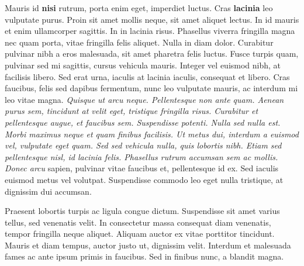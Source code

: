 \documentclass[12pt,a4paper]{report}
\begin{document}
{\color{emph} Mauris id\textbf{ nisi }rutrum, porta enim eget,  {\color{stress} imperdiet luctus. Cras \textbf{lacinia} leo} vulputate purus. Proin sit amet mollis neque, sit} amet aliquet lectus. In id mauris et enim ullamcorper sagittis. In in lacinia risus. Phasellus viverra fringilla magna  nec quam porta, vitae fringilla felis aliquet. Nulla in diam dolor. Curabitur pulvinar nibh a eros malesuada, sit amet pharetra felis luctus. Fusce turpis quam, pulvinar sed mi sagittis, cursus vehicula mauris. Integer vel euismod nibh, at facilisis libero. Sed erat urna, iaculis at lacinia iaculis, consequat et libero. Cras faucibus, felis sed dapibus fermentum, nunc leo vulputate mauris, ac interdum mi leo vitae magna.
\emph{
Quisque ut arcu neque. Pellentesque non ante quam. Aenean purus sem, tincidunt at velit eget, tristique fringilla risus. Curabitur et pellentesque augue, et faucibus sem. Suspendisse potenti. Nulla sed nulla est. Morbi maximus neque et quam finibus facilisis. Ut metus dui, interdum a euismod vel, vulputate eget quam. Sed sed vehicula nulla, quis lobortis nibh. Etiam sed pellentesque nisl, id lacinia felis. Phasellus rutrum accumsan sem ac mollis. Donec arcu }sapien, pulvinar vitae faucibus et, pellentesque id ex. Sed iaculis euismod metus vel volutpat. Suspendisse commodo leo eget nulla tristique, at dignissim dui accumsan.

Praesent lobortis turpis ac ligula congue dictum. Suspendisse sit amet varius tellus, sed venenatis velit. In consectetur massa consequat diam venenatis, tempor fringilla neque aliquet. Aliquam auctor ex vitae porttitor tincidunt. Mauris et diam tempus, auctor justo ut, dignissim velit. Interdum et malesuada fames ac ante ipsum primis in faucibus. Sed in finibus nunc, a blandit magna. 
\end{document}
